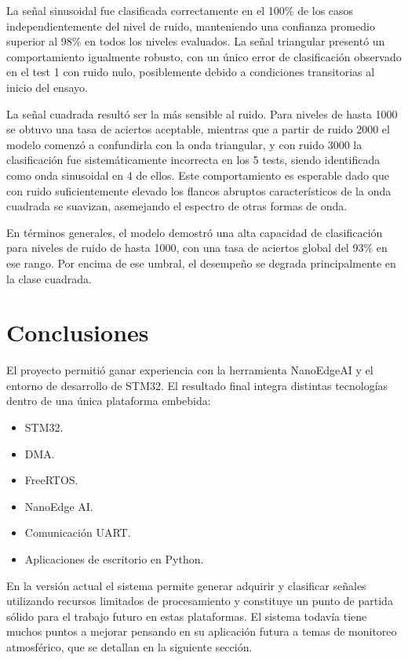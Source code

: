 \documentclass[a4paper,11pt]{article}
\begin{document}
La señal sinusoidal fue clasificada correctamente en el 100\% de los casos independientemente del nivel de ruido, manteniendo una confianza promedio superior al 98\% en todos los niveles evaluados. La señal triangular presentó un comportamiento igualmente robusto, con un único error de clasificación observado en el test 1 con ruido nulo, posiblemente debido a condiciones transitorias al inicio del ensayo.

La señal cuadrada resultó ser la más sensible al ruido. Para niveles de hasta 1000 se obtuvo una tasa de aciertos aceptable, mientras que a partir de ruido 2000 el modelo comenzó a confundirla con la onda triangular, y con ruido 3000 la clasificación fue sistemáticamente incorrecta en los 5 tests, siendo identificada como onda sinusoidal en 4 de ellos. Este comportamiento es esperable dado que con ruido suficientemente elevado los flancos abruptos característicos de la onda cuadrada se suavizan, asemejando el espectro de otras formas de onda.

En términos generales, el modelo demostró una alta capacidad de clasificación para niveles de ruido de hasta 1000, con una tasa de aciertos global del 93\% en ese rango. Por encima de ese umbral, el desempeño se degrada principalmente en la clase cuadrada.


\section{Conclusiones}

El proyecto permitió ganar experiencia con la herramienta NanoEdgeAI y el entorno de desarrollo de STM32. El resultado final integra distintas tecnologías dentro de una única plataforma embebida:

\begin{itemize}
\item STM32.
\item DMA.
\item FreeRTOS.
\item NanoEdge AI.
\item Comunicación UART.
\item Aplicaciones de escritorio en Python.
\end{itemize}


En la versión actual el sistema permite generar adquirir y clasificar señales utilizando recursos limitados de procesamiento y constituye un punto de partida sólido para el trabajo futuro en estas plataformas. El sistema todavía tiene muchos puntos a mejorar pensando en su aplicación futura a temas de monitoreo atmosférico, que se detallan en la siguiente sección.
\end{document}

